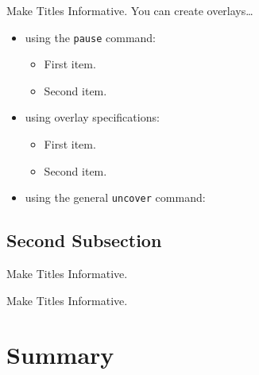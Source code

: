 \documentclass[t]{beamer}
\begin{document}
\begin{frame}{Make Titles Informative.}
    You can create overlays\dots
    \begin{itemize}
	\item using the \texttt{pause} command:
	    \begin{itemize}
		\item
		    First item.
		    \pause
		\item    
		    Second item.
	    \end{itemize}
	\item
	    using overlay specifications:
	    \begin{itemize}
		\item<3->
		    First item.
		\item<4->
		    Second item.
	    \end{itemize}
	\item
	    using the general \texttt{uncover} command:
	    \begin{itemize}
	    \end{itemize}
    \end{itemize}
\end{frame}


\subsection{Second Subsection}

\begin{frame}{Make Titles Informative.}
\end{frame}

\begin{frame}{Make Titles Informative.}
\end{frame}



\section*{Summary}
\end{document}
